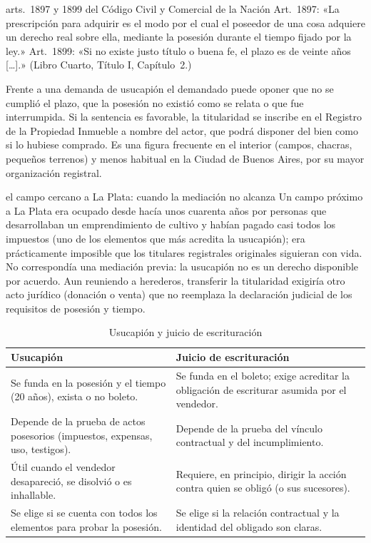 \documentclass[12pt,oneside]{book}
\begin{document}
\begin{regla}{arts.~1897 y 1899 del Código Civil y Comercial de la Nación}
Art.~1897: «La prescripción para adquirir es el modo por el cual el poseedor de una cosa adquiere un derecho real sobre ella, mediante la posesión durante el tiempo fijado por la ley.» Art.~1899: «Si no existe justo título o buena fe, el plazo es de veinte años [\ldots].» (Libro Cuarto, Título I, Capítulo~2.)
\end{regla}

Frente a una demanda de usucapión el demandado puede oponer que no se cumplió el plazo, que la posesión no existió como se relata o que fue interrumpida. Si la sentencia es favorable, la titularidad se inscribe en el Registro de la Propiedad Inmueble a nombre del actor, que podrá disponer del bien como si lo hubiese comprado. Es una figura frecuente en el interior (campos, chacras, pequeños terrenos) y menos habitual en la Ciudad de Buenos Aires, por su mayor organización registral.

\begin{ejemplo}{el campo cercano a La Plata: cuando la mediación no alcanza}
Un campo próximo a La Plata era ocupado desde hacía unos cuarenta años por personas que desarrollaban un emprendimiento de cultivo y habían pagado casi todos los impuestos (uno de los elementos que más acredita la usucapión); era prácticamente imposible que los titulares registrales originales siguieran con vida. No correspondía una mediación previa: la usucapión no es un derecho disponible por acuerdo. Aun reuniendo a herederos, transferir la titularidad exigiría otro acto jurídico (donación o venta) que no reemplaza la declaración judicial de los requisitos de posesión y tiempo.
\end{ejemplo}

\begin{table}[H]
\centering
\caption{Usucapión y juicio de escrituración}
\begin{tabularx}{\textwidth}{X X}
\toprule
\textbf{Usucapión} & \textbf{Juicio de escrituración} \\
\midrule
Se funda en la posesión y el tiempo (20 años), exista o no boleto. & Se funda en el boleto; exige acreditar la obligación de escriturar asumida por el vendedor. \\
Depende de la prueba de actos posesorios (impuestos, expensas, uso, testigos). & Depende de la prueba del vínculo contractual y del incumplimiento. \\
Útil cuando el vendedor desapareció, se disolvió o es inhallable. & Requiere, en principio, dirigir la acción contra quien se obligó (o sus sucesores). \\
Se elige si se cuenta con todos los elementos para probar la posesión. & Se elige si la relación contractual y la identidad del obligado son claras. \\
\bottomrule
\end{tabularx}
\end{table}
\end{document}
